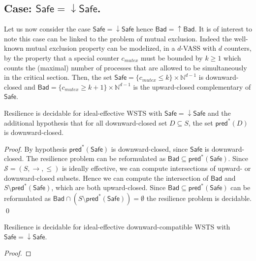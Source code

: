 \documentclass[runningheads]{llncs}
\newcommand{\pred}{\textsf{pred}}
\newcommand{\Bad}{\textsf{Bad}}
\newcommand{\Safe}{\textsf{Safe}}
\begin{document}
\subsection{Case: $\Safe=\downarrow \Safe$.}\label{safe-down}


Let us now consider the case $\Safe=\downarrow \Safe$ hence $\Bad=\uparrow \Bad$.
It is of interest to note this case can be linked to the problem of mutual exclusion.
Indeed the well-known mutual exclusion property can be modelized, in a $d$-VASS with $d$ counters, by the property that a special counter $c_{mutex}$ must be bounded by $k \geq 1$ which counts the (maximal) number of processes that are allowed to be simultaneously in the critical section. Then, the set $\Safe =  \{c_{mutex} \leq k\} \times \mathbb{N}^{d-1}$ is downward-closed		and $\Bad =\{c_{mutex} \geq k+1\} \times  \mathbb{N}^{d-1} $ is the upward-closed complementary of $\Safe$. 


%
\begin{theorem}\label{up-down}
{\sc Resilience}  is decidable for ideal-effective WSTS with 
$\Safe=\downarrow \Safe$
and
the additional hypothesis that
for all downward-closed set $D \subseteq S$, the set $\pred^*(D)$ is downward-closed.
\end{theorem}

\begin{proof}
By hypothesis $\pred^*(\Safe)$ is downward-closed, since $\Safe$ is downward-closed.
The resilience problem can be reformulated as 
$\Bad \subseteq  \pred^*(\Safe)$.
Since $\mathscr{S}=(S,\rightarrow, \leq)$ is ideally effective, we can compute intersections of upward- or downward-closed 
 subsets.
Hence we can compute the intersection of
$\Bad$
and
$S \setminus \pred^*(\Safe)$,
which are both upward-closed.
Since
$\Bad \subseteq \pred^*(\Safe)$
can be reformulated as
$\Bad \cap (S \setminus \pred^*(\Safe)) = \emptyset$
the resilience problem is decidable. \qed
\end{proof}



\begin{corollary}
{\sc Resilience} is decidable for ideal-effective downward-compatible WSTS with 
$\Safe=\downarrow \Safe$.
\end{corollary}

\begin{proof}

%
%
\end{proof}
\end{document}
